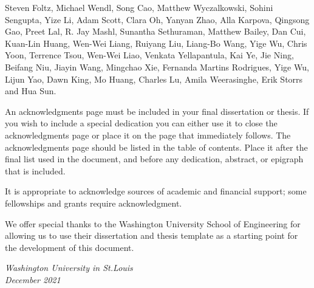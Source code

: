 

Steven Foltz, Michael Wendl, Song Cao, Matthew Wyczalkowski, Sohini Sengupta, Yize Li, Adam Scott, Clara Oh, Yanyan Zhao, Alla Karpova, Qingsong Gao, Preet Lal, R. Jay Mashl, Sunantha Sethuraman, Matthew Bailey, Dan Cui, Kuan-Lin Huang, Wen-Wei Liang, Ruiyang Liu, Liang-Bo Wang, Yige Wu, Chris Yoon, Terrence Tsou, Wen-Wei Liao, Venkata Yellapantula, Kai Ye, Jie Ning, Beifang Niu, Jiayin Wang, Mingchao Xie, Fernanda Martins Rodrigues, Yige Wu, Lijun Yao, Dawn King, Mo Huang, Charles Lu, Amila Weerasinghe, Erik Storrs and Hua Sun.

An acknowledgments page must be included in your final dissertation or thesis.  If you wish to
include a special dedication you can either use it to close the acknowledgments page or place it on
the page that immediately follows.  The acknowledgments page should be listed in the table of
contents.  Place it after the final list used in the document, and before any dedication, abstract,
or epigraph that is included.

It is appropriate to acknowledge sources of academic and financial support; some fellowships and
grants require acknowledgment.

We offer special thanks to the Washington University School of Engineering for allowing us to use
their dissertation and thesis template as a starting point for the development of this document.

\null\hfill \thesisauthor

\noindent
\textit{Washington University in St.\@ Louis}\\
\textit{December 2021}
